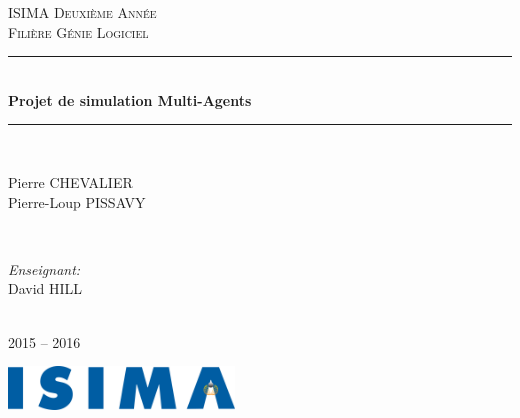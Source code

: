 \begin{titlepage}
  \newcommand{\HRule}{\rule{\linewidth}{0.5mm}}
  \center
  \null{}
  \vspace{3cm}

  \textsc{\LARGE ISIMA Deuxième Année}\\[1.5cm]
  \textsc{\Large Filière Génie Logiciel}\\[0.5cm]
  \HRule \\[0.4cm]
  { \huge \bfseries  Projet de simulation Multi-Agents}\\
  \HRule \\[1.5cm]

  \begin{minipage}{0.4\textwidth}
    \begin{flushleft} \large
      Pierre CHEVALIER\\
      Pierre-Loup PISSAVY
    \end{flushleft}
  \end{minipage}
  ~
  \begin{minipage}{0.4\textwidth}
    \begin{flushright} \large
      \emph{Enseignant:} \\
      David HILL
    \end{flushright}
  \end{minipage}\\[4cm]

  {\large 2015 -- 2016}\\[3cm]

  \vfill

  \includegraphics[width=6cm]{settings/ISIMA_logo.pdf}\\[1cm]
\end{titlepage}

